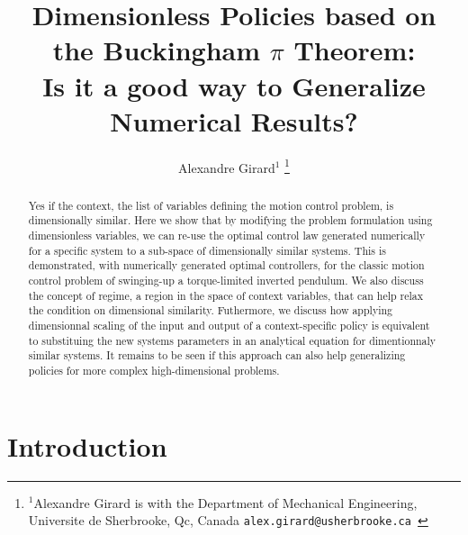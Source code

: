 

\title{\LARGE \bf
Dimensionless Policies based on the Buckingham $\pi$ Theorem: \\ 
Is it a good way to Generalize Numerical Results?
}


\author{Alexandre Girard$^{1}$%
\thanks{$^{1}$Alexandre Girard is with the Department of Mechanical Engineering, Universite de Sherbrooke, Qc, Canada {\tt\small  alex.girard@usherbrooke.ca }}%
}%


\maketitle
\thispagestyle{empty}
\pagestyle{empty}


\begin{abstract}
Yes if the context, the list of variables defining the motion control problem, is dimensionally similar. Here we show that by modifying the problem formulation using dimensionless variables, we can re-use the optimal control law generated numerically for a specific system to a sub-space of dimensionally similar systems. This is demonstrated, with numerically generated optimal controllers, for the classic motion control problem of swinging-up a torque-limited inverted pendulum. 
We also discuss the concept of regime, a region in the space of context variables, that can help relax the condition on dimensional similarity. Futhermore, we discuss how applying dimensionnal scaling of the input and output of a context-specific policy is equivalent to substituing the new systems parameters in an analytical equation for dimentionnaly similar systems. It remains to be seen if this approach can also help generalizing policies for more complex high-dimensional problems.
\end{abstract}

\section{Introduction}

